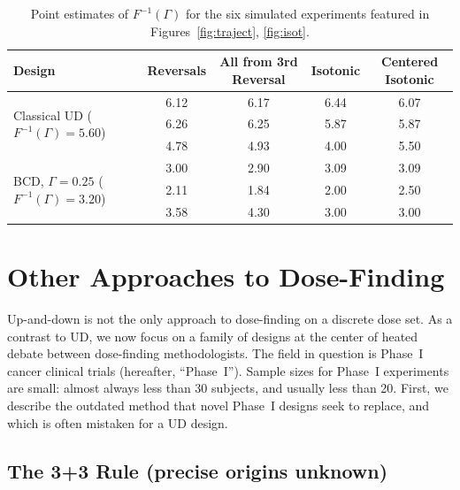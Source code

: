 \begin{table}[!ht]
\caption{Point estimates of $F^{-1}(\Gamma)$ for the six simulated experiments featured in Figures~\ref{fig:traject}, \ref{fig:isot}.}\label{tbl:est1}
\begin{center}
\begin{tabular}{p{3cm}cccc}
  \toprule
Design & Reversals & All from 3rd Reversal & Isotonic & Centered Isotonic \\
  \midrule
\multirow{3}{3cm}{Classical UD ($F^{-1}(\Gamma)=5.60$)} & 6.12 & 6.17 & 6.44 & 6.07 \\
   & 6.26 & 6.25 & 5.87 & 5.87 \\
   & 4.78 & 4.93 & 4.00 & 5.50 \\
\midrule
\multirow{3}{3cm}{BCD, $\Gamma=0.25$ ($F^{-1}(\Gamma)=3.20$)} & 3.00 & 2.90 & 3.09 & 3.09 \\
   & 2.11 & 1.84 & 2.00 & 2.50 \\
   & 3.58 & 4.30 & 3.00 & 3.00 \\
\bottomrule
\end{tabular}
\end{center}
\end{table}




\section{Other Approaches to Dose-Finding}\label{sec:other}

Up-and-down is not the only approach to dose-finding on a discrete dose set. As a contrast to UD, we now focus on a family of designs at the center of heated debate between dose-finding methodologists. The field in question is Phase~I cancer clinical trials (hereafter, ``Phase~I''). Sample sizes for Phase~I experiments are small: almost always less than 30 subjects, and usually less than 20. First, we describe the outdated method that novel Phase~I designs seek to replace, and which is often \citep{Rogat:etal:oped:2007,Zack:stag:2009} mistaken for a UD design.

\subsection{The 3+3 Rule (precise origins unknown)}

